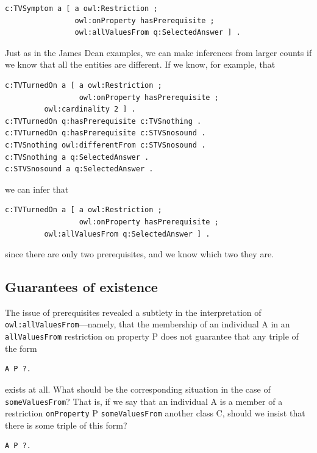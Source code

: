 \begin{lstlisting}
c:TVSymptom a [ a owl:Restriction ;
                owl:onProperty hasPrerequisite ;
                owl:allValuesFrom q:SelectedAnswer ] .
\end{lstlisting}

Just as in the James Dean examples, we can make inferences from larger
counts if we know that all the entities are different. If we know, for
example, that

\begin{lstlisting}
c:TVTurnedOn a [ a owl:Restriction ;
                 owl:onProperty hasPrerequisite ;
		 owl:cardinality 2 ] .
c:TVTurnedOn q:hasPrerequisite c:TVSnothing .
c:TVTurnedOn q:hasPrerequisite c:STVSnosound .
c:TVSnothing owl:differentFrom c:STVSnosound .
c:TVSnothing a q:SelectedAnswer .
c:STVSnosound a q:SelectedAnswer .
\end{lstlisting}

we can infer that

\begin{lstlisting}
c:TVTurnedOn a [ a owl:Restriction ;
                 owl:onProperty hasPrerequisite ;
		 owl:allValuesFrom q:SelectedAnswer ] .
\end{lstlisting}

since there are only two prerequisites, and we know which two they are.

\subsection{Guarantees of existence}

The issue of prerequisites revealed a subtlety in the interpretation of
\texttt{owl:allValuesFrom}---namely, that the membership of an individual A in an
\texttt{allValuesFrom} restriction on property P does not guarantee that any
triple of the form

\begin{lstlisting}
A P ?.
\end{lstlisting}

exists at all. What should be the corresponding situation in the case of
\texttt{someValuesFrom}? That is, if we say that an individual A is a member of a
restriction \texttt{onProperty} P \texttt{someValuesFrom} another class C, should we
insist that there is some triple of this form?

\begin{lstlisting}
A P ?.
\end{lstlisting}

